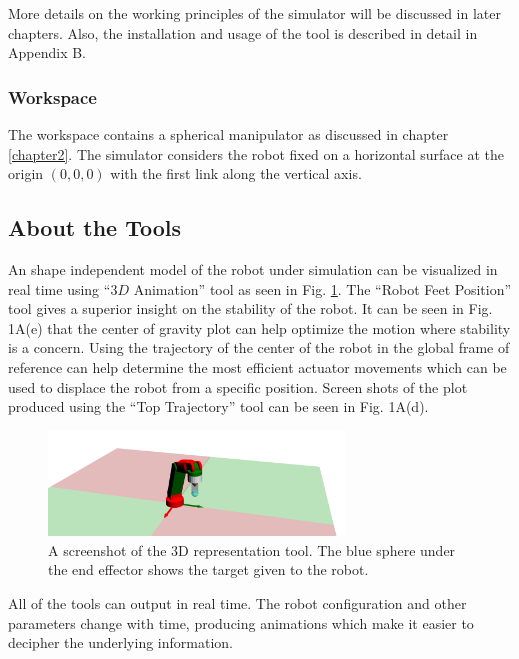 {    More details on the working principles of the simulator will be discussed in later chapters. Also, the installation and usage of the tool is described in detail in Appendix B.

    \subsubsection{Workspace}
    The workspace contains a spherical manipulator as discussed in chapter \ref{chapter2}. The simulator considers the robot fixed on a horizontal surface at the origin $(0, 0, 0)$ with the first link along the vertical axis.

    \subsection{About the Tools}

    An shape independent model of the robot under simulation can be visualized in real time using ``$3D$ Animation'' tool as seen in Fig. \ref{Fig3D}. The ``Robot Feet Position'' tool gives a superior insight on the stability of the robot. It can be seen in Fig. 1A(e) that the center of gravity plot can help optimize the motion where stability is a concern. Using the trajectory of the center of the robot in the global frame of reference can help determine the most efficient actuator movements which can be used to displace the robot from a specific position. Screen shots of the plot produced using the ``Top Trajectory'' tool can be seen in Fig. 1A(d).


        \begin{figure}
          \centering
          \includegraphics[width=0.7\textwidth]{3D.png}
          \caption{A screenshot of the $3$D representation tool. The blue sphere under the end effector shows the target given to the robot.
          } \label{Fig3D}
        \end{figure}

    All of the tools can output in real time. The robot configuration and other parameters change with time, producing animations which make it easier to decipher the underlying information.

}
